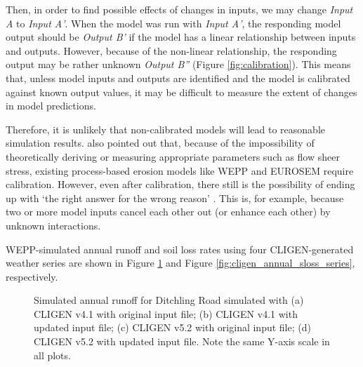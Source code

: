 Then, in order to find possible effects of changes in inputs, we may change
\emph{Input A} to \emph{Input A'}. When the model was run with \emph{Input A'},
the responding model output should be \emph{Output B'} if the model has a linear
relationship between inputs and outputs. However, because of the non-linear
relationship, the responding output may be rather unknown \emph{Output B''}
(Figure \ref{fig:calibration}). This means that, unless model inputs and outputs
are identified and the model is calibrated against known output values, it may
be difficult to measure the extent of changes in model predictions.

Therefore, it is unlikely that non-calibrated models will lead to reasonable
simulation results. \citet{wainwright2008-813} also pointed out that, because
of the impossibility of theoretically deriving or measuring appropriate
parameters such as flow sheer stress, existing process-based erosion models
like WEPP and EUROSEM require calibration. However, even after calibration,
there still is the possibility of ending up with `the right answer for the wrong
reason' \citep{favis-mortlock1994-use}. This is, for example, because two or
more model inputs cancel each other out (or enhance each other) by unknown
interactions.

WEPP-simulated annual runoff and soil loss rates using four CLIGEN-generated
weather series are shown in Figure \ref{fig:cligen_annual_runoff_serise} and
Figure \ref{fig:cligen_annual_sloss_series}, respectively.

\begin{figure}[htbp]
  \centering
    \qquad
  \caption[Simulated annual runoff for Ditchling Road]{Simulated annual
runoff for Ditchling Road simulated with (a) CLIGEN v4.1 with original input
file; (b) CLIGEN v4.1 with updated input file; (c) CLIGEN v5.2 with original
input file; (d) CLIGEN v5.2 with updated input file. Note the same Y-axis scale
in all plots.}
  \label{fig:cligen_annual_runoff_serise}
\end{figure}

